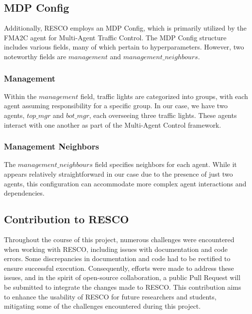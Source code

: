 \subsection{MDP Config}
Additionally, RESCO employs an MDP Config, which is primarily utilized by the FMA2C agent for Multi-Agent Traffic Control. The MDP Config structure includes various fields, many of which pertain to hyperparameters. However, two noteworthy fields are $management$ and $management\_neighbours$.

\subsubsection{Management}
Within the $management$ field, traffic lights are categorized into groups, with each agent assuming responsibility for a specific group. In our case, we have two agents, $top\_mgr$ and $bot\_mgr$, each overseeing three traffic lights. These agents interact with one another as part of the Multi-Agent Control framework.

\subsubsection{Management Neighbors}
The $management\_neighbours$ field specifies neighbors for each agent. While it appears relatively straightforward in our case due to the presence of just two agents, this configuration can accommodate more complex agent interactions and dependencies.

\subsection{Contribution to RESCO}
Throughout the course of this project, numerous challenges were encountered when working with RESCO, including issues with documentation and code errors. Some discrepancies in documentation and code had to be rectified to ensure successful execution. Consequently, efforts were made to address these issues, and in the spirit of open-source collaboration, a public Pull Request will be submitted to integrate the changes made to RESCO. This contribution aims to enhance the usability of RESCO for future researchers and students, mitigating some of the challenges encountered during this project.

